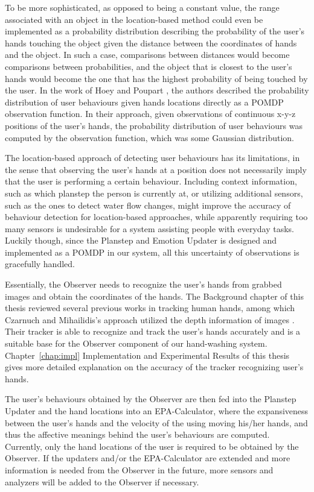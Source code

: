 To be more sophisticated, as opposed to being a constant value, the range associated with an object in the location-based method could even be implemented as a probability distribution describing the probability of the user's hands touching the object given the distance between the coordinates of hands and the object. In such a case, comparisons between distances would become comparisons between probabilities, and the object that is closest to the user's hands would become the one that has the highest probability of being touched by the user. In the work of Hoey and Poupart \cite{hoey2005solving}, the authors described the probability distribution of user behaviours given hands locations directly as a POMDP observation function. In their approach, given observations of continuous x-y-z positions of the user's hands, the probability distribution of user behaviours was computed by the observation function, which was some Gaussian distribution.

The location-based approach of detecting user behaviours has its limitations, in the sense that observing the user's hands at a position does not necessarily imply that the user is performing a certain behaviour. Including context information, such as which planstep the person is currently at, or utilizing additional sensors, such as the ones to detect water flow changes, might improve the accuracy of behaviour detection for location-based approaches, while apparently requiring too many sensors is undesirable for a system assisting people with everyday tasks. Luckily though, since the Planstep and Emotion Updater is designed and implemented as a POMDP in our system, all this uncertainty of observations is gracefully handled.

Essentially, the Observer needs to recognize the user's hands from grabbed images and obtain the coordinates of the hands. The Background chapter of this thesis reviewed several previous works in tracking human hands, among which Czarnuch and Mihailidis's approach utilized the depth information of images \cite{czarnuch2014}. Their tracker is able to recognize and track the user's hands accurately and is a suitable base for the Observer component of our hand-washing system. Chapter~\ref{chap:impl} Implementation and Experimental Results of this thesis gives more detailed explanation on the accuracy of the tracker recognizing user's hands.

The user's behaviours obtained by the Observer are then fed into the Planstep Updater and the hand locations into an EPA-Calculator, where the expansiveness between the user's hands and the velocity of the using moving his/her hands, and thus the affective meanings behind the user's behaviours are computed. Currently, only the hand locations of the user is required to be obtained by the Observer. If the updaters and/or the EPA-Calculator are extended and more information is needed from the Observer in the future, more sensors and analyzers will be added to the Observer if necessary.

